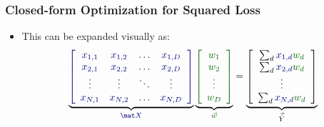 \documentclass[trans,aspectratio=169]{beamer}
\begin{document}
\begin{frame}
  \frametitle{Closed-form Optimization for Squared Loss}
\begin{itemize}
\item 
This can be expanded visually as:
%
\begin{equation}
\underbrace{
\textcolor{darkblue}{
\left[
\begin{array}{cccc}
  x_{1,1} & x_{1,2} & \dots & x_{1,D} \\
  x_{2,1} & x_{2,2} & \dots & x_{2,D} \\
  \vdots & \vdots & \ddots & \vdots \\
  x_{N,1} & x_{N,2} & \dots & x_{N,D}
\end{array}
\right]
}}_{\textcolor{darkblue}{\mat X}}
\underbrace{
\textcolor{darkergreen}{
\left[
\begin{array}{c}
  w_{1} \\
  w_{2} \\ 
  \vdots \\
  w_{D}
\end{array}
\right]
}}_{\textcolor{darkergreen}{\vec w}}
=
\underbrace{
\left[
\begin{array}{c}
  \sum_d \textcolor{darkblue}{x_{1,d}} \textcolor{darkergreen}{w_d} \\
  \sum_d \textcolor{darkblue}{x_{2,d}} \textcolor{darkergreen}{w_d} \\
  \vdots \\
  \sum_d \textcolor{darkblue}{x_{N,d}} \textcolor{darkergreen}{w_d}
\end{array}
\right]
}_{\vec{\hat Y}}
\end{equation}
\end{itemize}
\end{frame}
\end{document}
